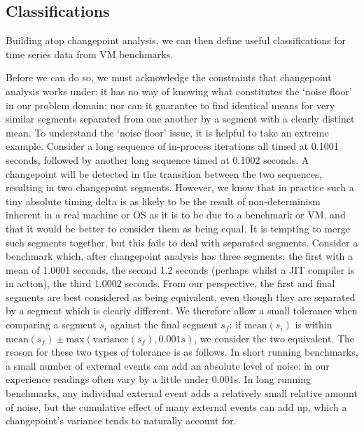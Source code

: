 \documentclass[acmlarge]{acmart}\settopmatter{printfolios=true}
\begin{document}
\subsection{Classifications}
\label{sec:classifications}

Building atop changepoint analysis, we can then define useful classifications
for time series data from VM benchmarks.

Before we can do so, we must
acknowledge the constraints that changepoint analysis works under: it has
no way of knowing what constitutes the `noise floor' in our problem domain; nor can it
guarantee to find identical means for very similar segments separated from
one another by a segment with a clearly distinct mean.
To understand the `noise floor' issue, it
is helpful to take an extreme example. Consider a long sequence of in-process
iterations all timed at 0.1001 seconds, followed by another long sequence timed
at 0.1002 seconds. A changepoint will be detected in the transition between the
two sequences, resulting in two changepoint segments. However, we know that in practice such a tiny absolute timing
delta is as likely to be the result of non-determinism inherent in a real
machine or OS as it is to be due to a benchmark or VM, and that it would be
better to consider them as being equal. It is tempting to merge such segments
together, but this fails to deal with separated segments. Consider a
benchmark which, after changepoint analysis has three segments: the first with a
mean of 1.0001 seconds, the second 1.2 seconds (perhaps whilst a JIT compiler is
in action), the third 1.0002 seconds. From our perspective, the first and final
segments are best considered as being equivalent, even though they are separated by a
segment which is clearly different. We therefore allow a small tolerance
when comparing a segment $s_i$ against the final segment $s_f$: if $\textrm{mean}(s_i)$
is within $\textrm{mean}(s_f) \pm \textrm{max}(\textrm{variance}(s_f), 0.001s)$,
we consider the two equivalent. The reason for these two types of tolerance
is as follows. In short running benchmarks, a small number of external events can add an absolute
level of noise: in our experience readings often vary by a
little under 0.001s. In long running benchmarks, any individual external
event adds a relatively small relative amount of noise, but the cumulative
effect of many external events can add up, which a changepoint's variance
tends to naturally account for.
\end{document}
